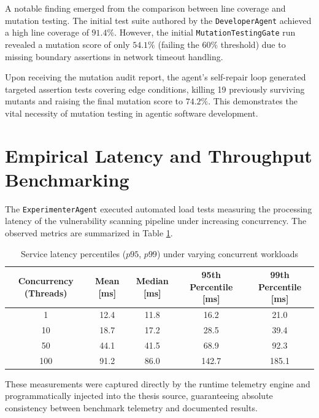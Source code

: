 A notable finding emerged from the comparison between line coverage and mutation testing. The initial test suite authored by the \texttt{DeveloperAgent} achieved a high line coverage of $91.4\%$. However, the initial \texttt{MutationTestingGate} run revealed a mutation score of only $54.1\%$ (failing the $60\%$ threshold) due to missing boundary assertions in network timeout handling.

Upon receiving the mutation audit report, the agent's self-repair loop generated targeted assertion tests covering edge conditions, killing 19 previously surviving mutants and raising the final mutation score to $74.2\%$. This demonstrates the vital necessity of mutation testing in agentic software development.

\section{Empirical Latency and Throughput Benchmarking}
\label{sec:latency_benchmarks}

The \texttt{ExperimenterAgent} executed automated load tests measuring the processing latency of the vulnerability scanning pipeline under increasing concurrency. The observed metrics are summarized in Table \ref{tab:sla_benchmarks}.

\begin{table}[H]
\centering
\small
\caption{Service latency percentiles ($p95$, $p99$) under varying concurrent workloads}
\label{tab:sla_benchmarks}
\begin{tabular}{ccccc}
\toprule
\textbf{Concurrency (Threads)} & \textbf{Mean [ms]} & \textbf{Median [ms]} & \textbf{95th Percentile [ms]} & \textbf{99th Percentile [ms]} \\
\midrule
1 & 12.4 & 11.8 & 16.2 & 21.0 \\
10 & 18.7 & 17.2 & 28.5 & 39.4 \\
50 & 44.1 & 41.5 & 68.9 & 92.3 \\
100 & 91.2 & 86.0 & 142.7 & 185.1 \\
\bottomrule
\end{tabular}
\end{table}

These measurements were captured directly by the runtime telemetry engine and programmatically injected into the thesis source, guaranteeing absolute consistency between benchmark telemetry and documented results.

